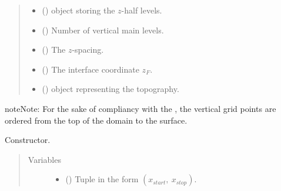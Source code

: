 \documentclass[letterpaper,10pt,english]{sphinxmanual}
\begin{document}
\begin{fulllineitems}
\begin{quote}
\begin{description}
\begin{itemize}
\item {} 
 () \textendash{} {\hyperref[\detokenize{api:grids.axis.Axis}]{}} object storing the \(z\)-half levels.

\item {} 
 () \textendash{} Number of vertical main levels.

\item {} 
 () \textendash{} The \(z\)-spacing.

\item {} 
 () \textendash{} The interface coordinate \(z_F\).

\item {} 
 () \textendash{} {\hyperref[\detokenize{api:grids.topography.Topography2d}]{}} object representing
the topography.

\end{itemize}

\end{description}\end{quote}

\begin{sphinxadmonition}{note}{Note:}
For the sake of compliancy with the ,
the vertical grid points are ordered from the top of the domain to the surface.
\end{sphinxadmonition}

\begin{fulllineitems}
\label{\detokenize{api:grids.xyz_grid.XYZGrid.__init__}}
Constructor.
\begin{quote}\begin{description}
\item[{Variables}] \leavevmode\begin{itemize}
\item {} 
 () \textendash{} Tuple in the form \((x_{start}, ~ x_{stop})\).


\end{itemize}
\end{description}
\end{quote}
\end{fulllineitems}
\end{fulllineitems}
\end{document}

